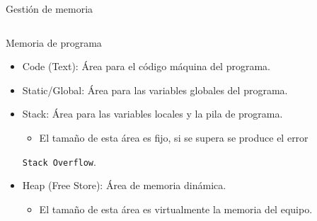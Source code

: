 \documentclass[aspectratio=169,presentation]{beamer}
\begin{document}
\begin{frame}[label={sec:org711ae77},fragile]{Gestión de memoria}
 \begin{columns}
\begin{column}{0.48\columnwidth}
\begin{block}{Memoria de programa}
\begin{itemize}
\item Code (Text): Área para el código máquina del programa.
\item Static/Global: Área para las variables globales del programa.
\item Stack: Área para las variables locales y la pila de programa.
\begin{itemize}
\item El tamaño de esta área es fijo, si se supera se produce el error
\end{itemize}
\texttt{Stack Overflow}.
\item Heap (Free Store): Área de memoria dinámica.
\begin{itemize}
\item El tamaño de esta área es virtualmente la memoria del equipo.
\end{itemize}
\end{itemize}
\end{block}
\end{column}
\begin{column}{0.28\columnwidth}
\begin{center}

\end{center}
\end{column}
\end{columns}
\end{frame}
\end{document}
